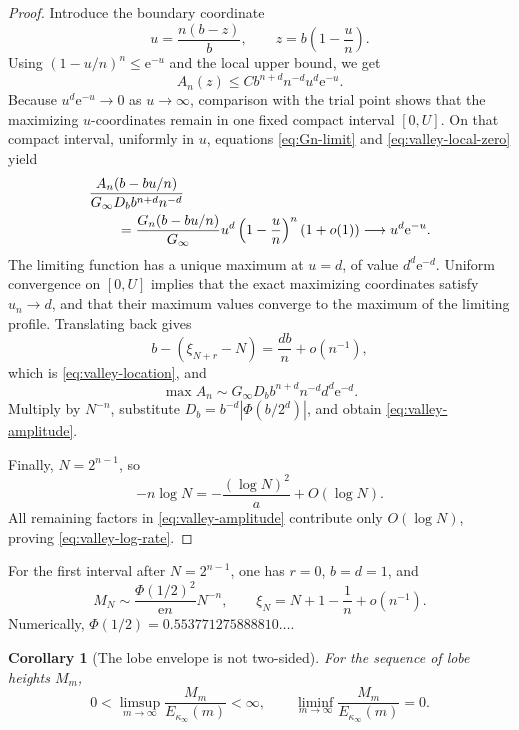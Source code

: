 \documentclass[11pt,oneside]{article}
\numberwithin{equation}{section}
\newtheorem{corollary}[theorem]{Corollary}
\theoremstyle{definition}
\theoremstyle{remark}
\newcommand{\e}{\mathrm e}
\newcommand{\abs}[1]{\left|#1\right|}
\newcommand{\PhiUp}{\Phi}
\begin{document}
\begin{proof}
Introduce the boundary coordinate
\begin{equation}
 u=\frac{n(b-z)}{b},
 \qquad z=b\left(1-\frac un\right).
 \label{eq:u-valley}
\end{equation}
Using \((1-u/n)^n\le\e^{-u}\) and the local upper bound, we get
\[
 A_n(z)\le Cb^{n+d}n^{-d}u^d\e^{-u}.
\]
Because \(u^d\e^{-u}\to0\) as \(u\to\infty\), comparison with the trial point shows
that the maximizing \(u\)-coordinates remain in one fixed compact interval \([0,U]\).
On that compact interval, uniformly in \(u\), equations
\eqref{eq:Gn-limit} and \eqref{eq:valley-local-zero} yield
\begin{align}
 &\frac{A_n(b-bu/n)}{G_\infty D_b b^{n+d}n^{-d}}\notag\\
 &\qquad=
 \frac{G_n(b-bu/n)}{G_\infty}
 u^d\left(1-\frac un\right)^n(1+o(1))
 \longrightarrow u^d\e^{-u}.
 \label{eq:valley-uniform-limit}
\end{align}
The limiting function has a unique maximum at \(u=d\), of value
\(d^d\e^{-d}\).  Uniform convergence on \([0,U]\) implies that the exact maximizing
coordinates satisfy \(u_n\to d\), and that their maximum values converge to the maximum of
the limiting profile.  Translating back gives
\[
 b-(\xi_{N+r}-N)=\frac{db}{n}+o(n^{-1}),
\]
which is \eqref{eq:valley-location}, and
\[
 \max A_n
 \sim G_\infty D_b b^{n+d}n^{-d}d^d\e^{-d}.
\]
Multiply by \(N^{-n}\), substitute
\(D_b=b^{-d}\abs{\PhiUp(b/2^d)}\), and obtain
\eqref{eq:valley-amplitude}.

Finally, \(N=2^{n-1}\), so
\[
 -n\log N=-\frac{(\log N)^2}{a}+O(\log N).
\]
All remaining factors in \eqref{eq:valley-amplitude} contribute only \(O(\log N)\), proving
\eqref{eq:valley-log-rate}.
\end{proof}

For the first interval after \(N=2^{n-1}\), one has \(r=0\), \(b=d=1\), and
\begin{equation}
 M_N\sim\frac{\PhiUp(1/2)^2}{\e n}N^{-n},
 \qquad
 \xi_N=N+1-\frac1n+o(n^{-1}).
 \label{eq:first-dyadic-valley}
\end{equation}
Numerically, \(\PhiUp(1/2)=0.553771275888810\ldots\).

\begin{corollary}[The lobe envelope is not two-sided]
\label{cor:lobe-limsup-liminf}
For the sequence of lobe heights \(M_m\),
\begin{equation}
 0<\limsup_{m\to\infty}\frac{M_m}{E_{\kappa_\infty}(m)}<\infty,
 \qquad
 \liminf_{m\to\infty}\frac{M_m}{E_{\kappa_\infty}(m)}=0.
 \label{eq:lobe-limsup-liminf}
\end{equation}
\end{corollary}
\end{document}
